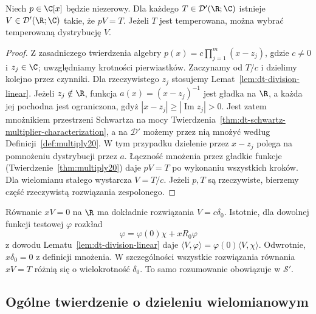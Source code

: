 \begin{twierdzenie}
\label{thm:dt-polynomial-division-one}
Niech $p\in\C[x]$ będzie niezerowy.
Dla każdego $T\in\mathcal D'(\R;\C)$ istnieje
$V\in\mathcal D'(\R;\C)$ takie, że $pV=T$.
Jeżeli $T$ jest temperowana, można wybrać
temperowaną dystrybucję $V$.
\end{twierdzenie}
\begin{proof}
Z zasadniczego twierdzenia algebry
$p(x)=c\prod_{j=1}^m(x-z_j)$, gdzie $c\ne0$
i $z_j\in\C$; uwzględniamy krotności pierwiastków.
Zaczynamy od $T/c$ i dzielimy kolejno przez czynniki.
Dla rzeczywistego $z_j$ stosujemy
Lemat~\ref{lem:dt-division-linear}.
Jeżeli $z_j\notin\R$, funkcja
$a(x)=(x-z_j)^{-1}$ jest gładka na $\R$,
a każda jej pochodna jest ograniczona, gdyż
$|x-z_j|\ge|\operatorname{Im}z_j|>0$.
Jest zatem mnożnikiem przestrzeni Schwartza
na mocy Twierdzenia~\ref{thm:dt-schwartz-multiplier-characterization},
a na $\mathcal D'$ możemy przez nią mnożyć
według Definicji~\ref{def:multiply20}.
W tym przypadku dzielenie przez $x-z_j$ polega
na pomnożeniu dystrybucji przez $a$.
Łączność mnożenia przez gładkie funkcje
(Twierdzenie~\ref{thm:multiply20}) daje
$pV=T$ po wykonaniu wszystkich kroków.
Dla wielomianu stałego wystarcza $V=T/c$.
Jeżeli $p,T$ są rzeczywiste, bierzemy część
rzeczywistą rozwiązania zespolonego.
\end{proof}

\begin{przyklad}
\label{ex:dt-division-x}
Równanie $xV=0$ na $\R$ ma dokładnie rozwiązania
$V=c\delta_0$. Istotnie, dla dowolnej funkcji
testowej $\varphi$ rozkład
\[
 \varphi=\varphi(0)\chi+x R_0\varphi
\]
z dowodu Lematu~\ref{lem:dt-division-linear} daje
$\langle V,\varphi\rangle
=\varphi(0)\langle V,\chi\rangle$.
Odwrotnie, $x\delta_0=0$ z definicji mnożenia.
W szczególności wszystkie rozwiązania równania
$xV=T$ różnią się o wielokrotność $\delta_0$.
To samo rozumowanie obowiązuje w $\mathcal S'$.
\end{przyklad}

\subsection{Ogólne twierdzenie o dzieleniu wielomianowym}


